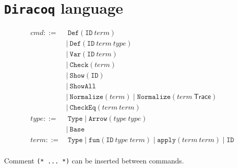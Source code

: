 \documentclass[runningheads]{llncs}
\begin{document}

\section{\texttt{Diracoq} language}

\begin{align*}
    cmd ::=&\ \texttt{Def}(\texttt{ID}\ term) \\
        &|\ \texttt{Def}(\texttt{ID}\ term\ type) \\
        &|\ \texttt{Var}(\texttt{ID}\ term) \\
        &|\ \texttt{Check}(term) \\
        &|\ \texttt{Show}(\texttt{ID}) \\
        &|\ \texttt{ShowAll} \\
        &|\ \texttt{Normalize}(term) \mid \texttt{Normalize}(term\ \textsf{Trace}) \\
        &|\ \texttt{CheckEq}(term\ term) \\
    type ::=&\ \texttt{Type} \mid \texttt{Arrow}(type\ type) \\
            &|\ \texttt{Base} \\
    term ::=&\ \texttt{Type} \mid \texttt{fun}(\texttt{ID}\ type\ term) \mid \texttt{apply}(term\ term) \mid \texttt{ID} \\
\end{align*}

Comment \texttt{(* ... *)} can be inserted between commands.
\end{document}
